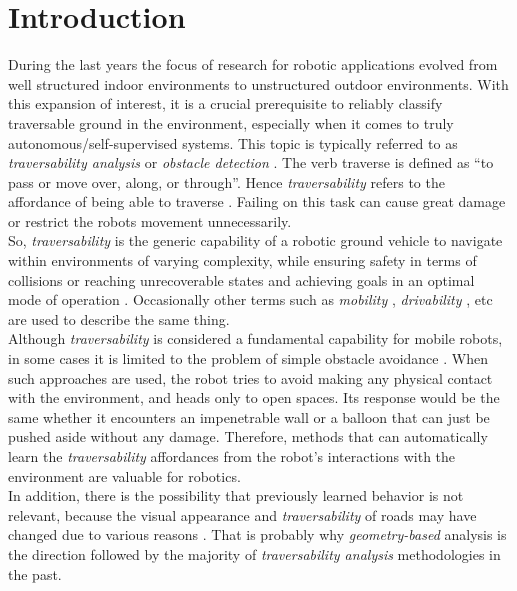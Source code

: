 \documentclass[12pt,a4paper]{report}
\newcommand{\defn}{\enquote}
\newcommand{\term}{\textit}
\begin{document}
	{
		\hypersetup{linkcolor=black}
		\tableofcontents
	}
	
	\chapter{Introduction}
	\label{sec:intro}
	
	During the last years the focus of research for robotic applications evolved 
	from well structured indoor environments to unstructured outdoor environments. 
	With this expansion of interest, it is a crucial prerequisite to reliably 
	classify traversable ground in the environment, especially when it comes to 
	truly autonomous/self-supervised systems. This topic is typically referred to as 
	\term{traversability analysis} or \term{obstacle detection} \cite{Suger}. The 
	verb traverse is defined as \defn{to pass or move over, along, or through}. 
	Hence \term{traversability} refers to the affordance of being able to traverse 
	\cite{Ugur}. Failing on this task can cause great damage or restrict the robots 
	movement unnecessarily.
	\\
	
	So, \term{traversability} is the generic capability of a robotic ground 
	vehicle to navigate within environments of varying complexity, while ensuring 
	safety in terms of collisions or reaching unrecoverable states and achieving 
	goals in an optimal mode of operation \cite{Papadakis}. Occasionally other 
	terms such as \term{mobility} \cite{Lalonde}, \term{drivability} \cite{Droeschel}, 
	etc are used to describe the same thing.
	\\
	
	Although \term{traversability} is considered a fundamental capability for mobile 
	robots, in some cases it is limited to the problem of simple obstacle avoidance 
	\cite{Ugur}. When such approaches are used, the robot tries to avoid making any 
	physical contact with the environment, and heads only to open spaces. Its 
	response would be the same whether it encounters an impenetrable wall or a 
	balloon that can just be pushed aside without any damage. Therefore, methods 
	that can automatically learn the \term{traversability} affordances from the 
	robot’s interactions with the environment are valuable for robotics.
	\\
		
	In addition, there is the possibility that previously learned behavior is not 
	relevant, because the visual appearance and \term{traversability} of roads may 
	have changed due to various reasons \cite{Wigness}. That is probably why 
	\term{geometry-based} analysis is the direction followed by the majority of 
	\term{traversability analysis} methodologies in the past\cite{Papadakis}.
	\\
	
\end{document}
